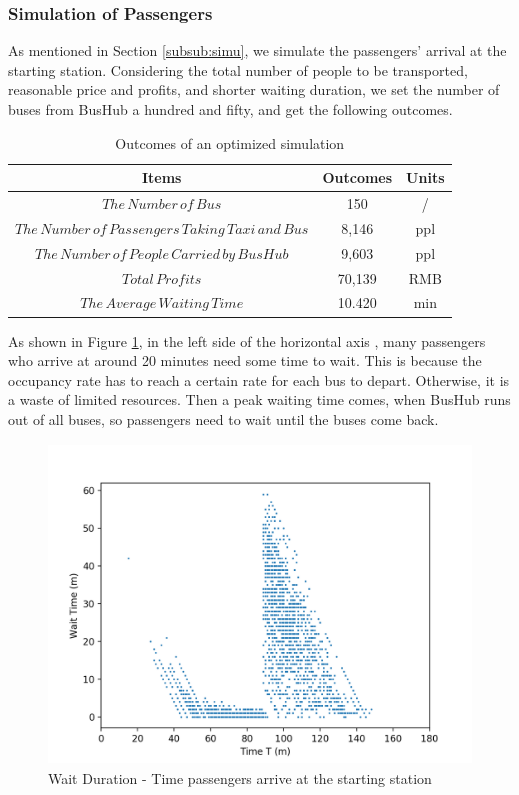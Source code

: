 \documentclass{mcmthesis}
\begin{document}
\subsubsection{Simulation of Passengers}

As mentioned in Section \ref{subsub:simu}, we simulate the passengers' arrival at the starting station. Considering the total number of people to be transported, reasonable price and profits, and shorter waiting duration, we set the number of buses from BusHub a hundred and fifty, and get the following outcomes.
\begin{table}[h]
    \centering
    \caption{Outcomes of an optimized simulation}
    \label{tab:simu}
    \linespread{1.5}
    \begin{tabular}{c c c}
\hline
    	Items & Outcomes & Units\\
\hline
	$The\, Number\, of\, Bus$ & 150 & / \\
	$The\, Number\, of\, Passengers\, Taking\, Taxi\, and\, Bus$ & 8,146 & ppl \\
	$The\, Number\, of\, People\, Carried\, by\, BusHub$ & 9,603 & ppl \\
	$Total\, Profits$ & 70,139 & RMB \\
	$The\, Average\, Waiting\, Time$ & 10.420 & min \\
\hline
    \end{tabular}
\end{table}

As shown in Figure \ref{150}, in the left side of the horizontal axis
, many passengers who arrive at around 20 minutes need some time to wait. This is because the occupancy rate has to reach a certain rate for each bus to depart. Otherwise, it is a waste of limited resources. Then a peak waiting time comes, when BusHub runs out of all buses, so passengers need to wait until the buses come back. 

\begin{figure}[htbp]
    \centering
    \includegraphics[height=8.5cm,width=16cm]{figures/waittime150.png}
    \caption{Wait Duration - Time passengers arrive at the starting station}
    \label{150}
\end{figure}
\end{document}
